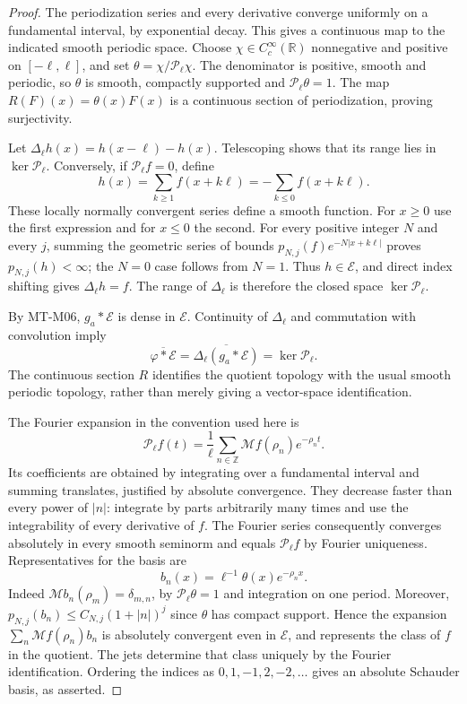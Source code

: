 \begin{proof}
The periodization series and every derivative converge uniformly on a
fundamental interval, by exponential decay. This gives a continuous map
to the indicated smooth periodic space. Choose
$\chi\in C_c^\infty(\mathbb R)$ nonnegative and positive on
$[-\ell,\ell]$, and set
$\theta=\chi/\mathcal P_\ell\chi$. The denominator is positive,
smooth and periodic, so $\theta$ is smooth, compactly supported and
$\mathcal P_\ell\theta=1$. The map
$R(F)(x)=\theta(x)F(x)$ is a continuous section of periodization,
proving surjectivity.

Let $\Delta_\ell h(x)=h(x-\ell)-h(x)$. Telescoping shows that its
range lies in $\ker\mathcal P_\ell$. Conversely, if
$\mathcal P_\ell f=0$, define
\[
 h(x)=\sum_{k\ge1}f(x+k\ell)
     =-\sum_{k\le0}f(x+k\ell).
\]
These locally normally convergent series define a smooth function.
For $x\ge0$ use the first expression and for $x\le0$ the second.
For every positive integer $N$ and every $j$, summing the geometric
series of bounds $p_{N,j}(f)e^{-N|x+k\ell|}$ proves
$p_{N,j}(h)<\infty$; the $N=0$ case follows from $N=1$.
Thus $h\in\mathcal E$, and direct index shifting gives
$\Delta_\ell h=f$. The range of $\Delta_\ell$ is therefore the
closed space $\ker\mathcal P_\ell$.

By MT-M06, $g_a*\mathcal E$ is dense in $\mathcal E$.
Continuity of $\Delta_\ell$ and commutation with convolution imply
\[
 \overline{\varphi*\mathcal E}
 =\overline{\Delta_\ell(g_a*\mathcal E)}
 =\ker\mathcal P_\ell.
\]
The continuous section $R$ identifies the quotient topology with
the usual smooth periodic topology, rather than merely giving a
vector-space identification.

The Fourier expansion in the convention used here is
\[
 \mathcal P_\ell f(t)=\frac1\ell
       \sum_{n\in\mathbb Z}\mathcal Mf(\rho_n)e^{-\rho_n t}.
\]
Its coefficients are obtained by integrating over a fundamental
interval and summing translates, justified by absolute convergence.
They decrease faster than every power of $|n|$: integrate by parts
arbitrarily many times and use the integrability of every derivative
of $f$. The Fourier series consequently converges absolutely in
every smooth seminorm and equals $\mathcal P_\ell f$ by Fourier
uniqueness. Representatives for the basis are
\[
                     b_n(x)=\ell^{-1}\theta(x)e^{-\rho_n x}.
\]
Indeed $\mathcal Mb_n(\rho_m)=\delta_{m,n}$, by
$\mathcal P_\ell\theta=1$ and integration on one period. Moreover,
$p_{N,j}(b_n)\le C_{N,j}(1+|n|)^j$ since $\theta$ has compact
support. Hence the expansion
$\sum_n\mathcal Mf(\rho_n)b_n$ is absolutely convergent even in
$\mathcal E$, and represents the class of $f$ in the quotient.
The jets determine that class uniquely by the Fourier identification.
Ordering the indices as $0,1,-1,2,-2,\ldots$ gives an absolute
Schauder basis, as asserted.
\end{proof}


